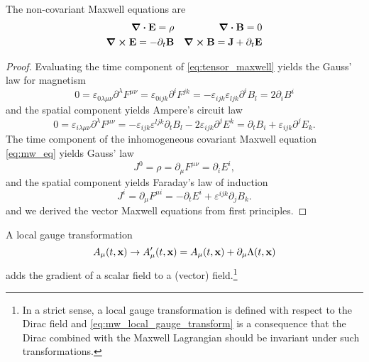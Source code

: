 \begin{theorem}\label{thm:vector_maxwell}
	The non-covariant Maxwell equations are
	\begin{align}
		\div\vb{E}
		=
		\rho
		&&
		\div\vb{B}
		=
		0
		\label{eq:vector_maxwell_homo}
		\\
		\curl\vb{E}
		=
		-
		\partial_t\vb{B}
		&&
		\curl\vb{B}
		=
		\vb{J}
		+
		\partial_t\vb{E}
		\label{eq:vector_maxwell_inhomo}
	\end{align}
\end{theorem}
\begin{proof}
	Evaluating the time component of \cref{eq:tensor_maxwell} yields the Gauss' law for magnetism
	\begin{equation*}
		0
		=
		\varepsilon_{0\lambda\mu\nu}\partial^\lambda F^{\mu\nu}
		=
		\varepsilon_{0ijk}\partial^iF^{jk}
		=
		-
		\varepsilon_{ijk}\varepsilon_{ljk}
		\partial^i B_l
		=
		2\partial_iB^i
	\end{equation*}
	and the spatial component yields Ampere's circuit law
	\begin{equation*}
		0
		=
		\varepsilon_{i\lambda\mu\nu}
		\partial^\lambda
		F^{\mu\nu}
		=
		-
		\varepsilon_{ijk}
		\varepsilon^{ljk}
		\partial_t B_l
		-
		2\varepsilon_{ijk}
		\partial^jE^k
		=
		\partial_tB_i
		+
		\varepsilon_{ijk}
		\partial^jE_k
		.
	\end{equation*}
	The time component of the inhomogeneous covariant Maxwell equation \cref{eq:mw_eq} yields Gauss' law
	\begin{equation*}
		J^0
		=
		\rho
		=
		\partial_\mu F^{\mu\nu}
		=
		\partial_i E^i
		,
	\end{equation*}
	and the spatial component yields Faraday's law of induction
	\begin{equation*}
		J^i
		=
		\partial_\mu F^{\mu i}
		=
		-
		\partial_t E^i
		+
		\varepsilon^{ijk}
		\partial_j
		B_k
		.
	\end{equation*}
	and we derived the vector Maxwell equations from first principles.
\end{proof}

\begin{definition}
	A local gauge transformation
	\begin{equation}
		A_\mu(t,\vb{x})
		\to
		A_\mu^\prime(t,\vb{x})
		=
		A_\mu(t,\vb{x})
		+
		\partial_\mu\Lambda(t,\vb{x})
		\label{eq:mw_local_gauge_transform}
	\end{equation}
	adds the gradient of a scalar field to a (vector) field.\footnote{In a strict sense, a local gauge transformation is defined with respect to the Dirac field and \cref{eq:mw_local_gauge_transform} is a consequence that the Dirac combined with the Maxwell Lagrangian should be invariant under such transformations.}
\end{definition}


